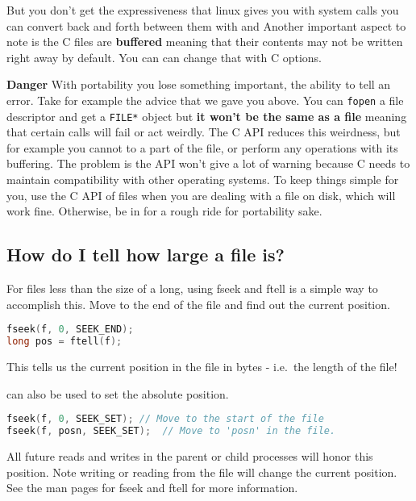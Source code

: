 But you don't get the expressiveness that linux gives you with system calls you can convert back and forth between them with  and  Another important aspect to note is the C files are \textbf{buffered} meaning that their contents may not be written right away by default. You can can change that with C options.

\textbf{Danger} With portability you lose something important, the ability to tell an error. Take for example the advice that we gave you above. You can \texttt{fopen} a file descriptor and get a \texttt{FILE*} object but \textbf{it won't be the same as a file} meaning that certain calls will fail or act weirdly.
The C API reduces this weirdness, but for example you cannot  to a part of the file, or perform any operations with its buffering.
The problem is the API won't give a lot of warning because C needs to maintain compatibility with other operating systems.
To keep things simple for you, use the C API of files when you are dealing with a file on disk, which will work fine. Otherwise, be in for a rough ride for portability sake.

\subsection{How do I tell how large a file is?}

For files less than the size of a long, using fseek and ftell is a
simple way to accomplish this. Move to the end of the file and find out the current position.

\begin{lstlisting}[language=C]
fseek(f, 0, SEEK_END);
long pos = ftell(f);
\end{lstlisting}

This tells us the current position in the file in bytes - i.e.~the
length of the file!

 can also be used to set the absolute position.

\begin{lstlisting}[language=C]
fseek(f, 0, SEEK_SET); // Move to the start of the file
fseek(f, posn, SEEK_SET);  // Move to 'posn' in the file.
\end{lstlisting}

All future reads and writes in the parent or child processes will honor this position.
Note writing or reading from the file will change the current position.
See the man pages for fseek and ftell for more information.

